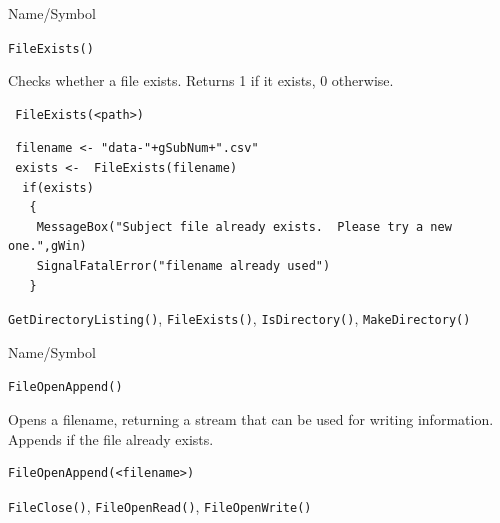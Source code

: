 \begin{desc}{Name/Symbol}
\item[Name/Symbol]	\verb+FileExists()+

\item[Description]	Checks whether a file exists.  Returns 1 if it exists, 0 otherwise.
\item[Usage]		
\begin{verbatim}
 FileExists(<path>)
\end{verbatim}

\item[Example]	
\begin{verbatim}
 filename <- "data-"+gSubNum+".csv"
 exists <-  FileExists(filename)
  if(exists)
   {
    MessageBox("Subject file already exists.  Please try a new one.",gWin) 
    SignalFatalError("filename already used")
   }
\end{verbatim}

\item[See Also]\verb+GetDirectoryListing()+, \verb+FileExists()+,       \verb+IsDirectory()+,        
   \verb+MakeDirectory()+      

\end{desc}




\begin{desc}{Name/Symbol}
\item[Name/Symbol]	\verb+FileOpenAppend()+

\item[Description] Opens a filename, returning a stream that can be
  used for writing information.  Appends if the file already exists.

\item[Usage]
\begin{verbatim}
FileOpenAppend(<filename>)
\end{verbatim}

\item[Example]	

\item[See Also]	\verb+FileClose()+, \verb+FileOpenRead()+, \verb+FileOpenWrite()+
\end{desc}



